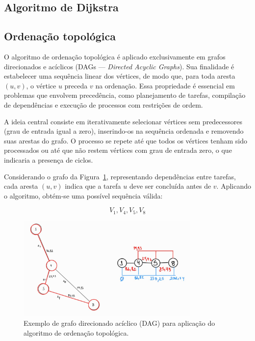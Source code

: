 \subsection{Algoritmo de Dijkstra}\label{sec:dijkstra}

\subsection{Ordenação topológica}\label{sec:ordTopologica}

O algoritmo de ordenação topológica é aplicado exclusivamente em grafos direcionados e acíclicos (DAGs — \textit{Directed Acyclic Graphs}). Sua finalidade é estabelecer uma sequência linear dos vértices, de modo que, para toda aresta $(u, v)$, o vértice $u$ preceda $v$ na ordenação. Essa propriedade é essencial em problemas que envolvem precedência, como planejamento de tarefas, compilação de dependências e execução de processos com restrições de ordem.

A ideia central consiste em iterativamente selecionar vértices sem predecessores (grau de entrada igual a zero), inserindo-os na sequência ordenada e removendo suas arestas do grafo. O processo se repete até que todos os vértices tenham sido processados ou até que não restem vértices com grau de entrada zero, o que indicaria a presença de ciclos.

Considerando o grafo da Figura~\ref{fig:ordTopologica}, representando dependências entre tarefas, cada aresta $(u,v)$ indica que a tarefa $u$ deve ser concluída antes de $v$. Aplicando o algoritmo, obtém-se uma possível sequência válida:

\[
V_1, V_4, V_5, V_8
\]

\begin{figure}[H]
    \centering
    \includegraphics[width=0.8\textwidth]{figuras/topologigi.jpeg}
    \caption{Exemplo de grafo direcionado acíclico (DAG) para aplicação do algoritmo de ordenação topológica.}
    \label{fig:ordTopologica}
\end{figure}

